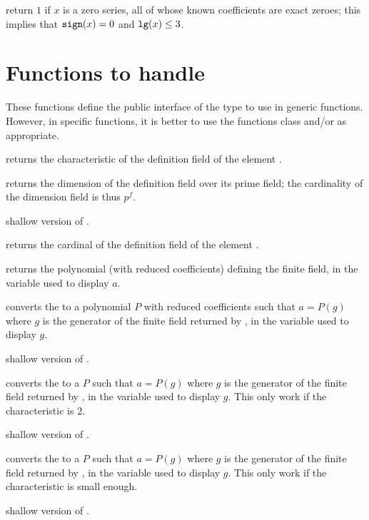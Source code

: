  return $1$ if $x$ is a zero series, all
of whose known coefficients are exact zeroes; this implies that
${\tt sign}(x) = 0$ and ${\tt lg}(x) \leq 3$.

\section{Functions to handle }
These functions define the public interface of the  type to use in
generic functions.  However, in specific functions, it is better to use the
functions class  and/or  as appropriate.

 returns the characteristic of the definition field of the
 element .

 returns the dimension of the definition field over
its prime field; the cardinality of the dimension field is thus $p^f$.

 shallow version of .

 returns the cardinal of the definition field of the
 element .

 returns the polynomial (with reduced 
coefficients) defining the finite field, in the variable used to display $a$.

 converts the   to a polynomial
$P$ with reduced  coefficients such that $a=P(g)$ where $g$ is the
generator of the finite field returned by , in the variable used to
display $g$.

 shallow version of .

 converts the   to a 
$P$ such that $a=P(g)$ where $g$ is the generator of the finite field returned
by , in the variable used to display $g$. This only work if the
characteristic is $2$.

 shallow version of .

 converts the   to a 
$P$ such that $a=P(g)$ where $g$ is the generator of the finite field returned
by , in the variable used to display $g$. This only work if the
characteristic is small enough.

 shallow version of .

